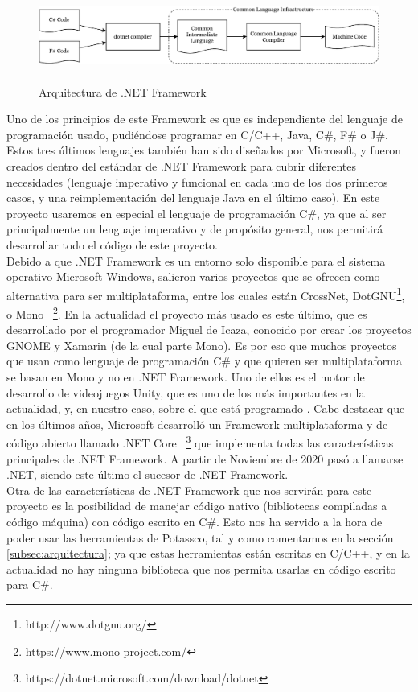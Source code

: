 \begin{figure}[h]
	\centering
	\includegraphics[height=6em]{images/arquitectura-cli}
	\label{fig:cli}
	\caption{Arquitectura de .NET Framework}
\end{figure}

Uno de los principios de este Framework es que es independiente del lenguaje de programación usado, pudiéndose programar en C/C++, Java, C\#, F\# o J\#. Estos tres últimos lenguajes también han sido diseñados por Microsoft, y fueron creados dentro del estándar de .NET Framework para cubrir diferentes necesidades (lenguaje imperativo y funcional en cada uno de los dos primeros casos, y una reimplementación del lenguaje Java en el último caso). En este proyecto usaremos en especial el lenguaje de programación C\#, ya que al ser principalmente un lenguaje imperativo y de propósito general, nos permitirá desarrollar todo el código de este proyecto. \\

Debido a que .NET Framework es un entorno solo disponible para el sistema operativo Microsoft Windows, salieron varios proyectos que se ofrecen como alternativa para ser multiplataforma, entre los cuales están CrossNet, DotGNU\footnote{http://www.dotgnu.org/}, o Mono~ \footnote{https://www.mono-project.com/}. En la actualidad el proyecto más usado es este último, que es desarrollado por el programador Miguel de Icaza, conocido por crear los proyectos GNOME y Xamarin (de la cual parte Mono). Es por eso que muchos proyectos que usan como lenguaje de programación C\# y que quieren ser multiplataforma se basan en Mono y no en .NET Framework. Uno de ellos es el motor de desarrollo de videojuegos Unity, que es uno de los más importantes en la actualidad, y, en nuestro caso, sobre el que está programado \cities. Cabe destacar que en los últimos años, Microsoft desarrolló un Framework multiplataforma y de código abierto llamado .NET Core~ \footnote{https://dotnet.microsoft.com/download/dotnet} que implementa todas las características principales de .NET Framework. A partir de Noviembre de 2020 pasó a llamarse .NET, siendo este último el sucesor de .NET Framework. \\

Otra de las características de .NET Framework que nos servirán para este proyecto es la posibilidad de manejar código nativo (bibliotecas compiladas a código máquina) con código escrito en C\#. Esto nos ha servido a la hora de poder usar las herramientas de Potassco, tal y como comentamos en la sección \ref{subsec:arquitectura}; ya que estas herramientas están escritas en C/C++, y en la actualidad no hay ninguna biblioteca que nos permita usarlas en código escrito para C\#.

